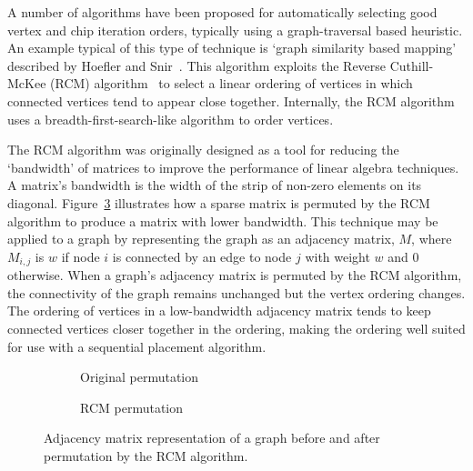 				A number of algorithms have been proposed for automatically selecting
				good vertex and chip iteration orders, typically using a
				graph-traversal based heuristic. An example typical of this type of
				technique is `graph similarity based mapping' described by Hoefler and
				Snir~\cite{hoefler11}. This algorithm exploits the Reverse
				Cuthill-McKee (RCM) algorithm~\cite{cuthill69} to select a linear
				ordering of vertices in which connected vertices tend to appear close
				together. Internally, the RCM algorithm uses a breadth-first-search-like
				algorithm to order vertices.
				
				The RCM algorithm was originally designed as a tool for reducing the
				`bandwidth' of matrices to improve the performance of linear algebra
				techniques. A matrix's bandwidth is the width of the strip of non-zero
				elements on its diagonal. Figure~\ref{fig:rcm} illustrates how a sparse
				matrix is permuted by the RCM algorithm to produce a matrix with lower
				bandwidth. This technique may be applied to a graph by representing the
				graph as an adjacency matrix, $M$, where $M_{i,j}$ is $w$ if node $i$
				is connected by an edge to node $j$ with weight $w$ and 0 otherwise.
				When a graph's adjacency matrix is permuted by the RCM algorithm, the
				connectivity of the graph remains unchanged but the vertex ordering
				changes. The ordering of vertices in a low-bandwidth adjacency matrix
				tends to keep connected vertices closer together in the ordering, making
				the ordering well suited for use with a sequential placement algorithm.
				
				\begin{figure}
					\center
					\begin{subfigure}{0.45\linewidth}
						\center
						
						\caption{Original permutation}
						\label{fig:rcm-initial}
					\end{subfigure}
					\begin{subfigure}{0.45\linewidth}
						\center
						
						\caption{RCM permutation}
						\label{fig:rcm-sorted}
					\end{subfigure}
					
					\caption[Graph adjacency matrix before and after RCM permutation.]%
					{Adjacency matrix representation of a graph before and after
					permutation by the RCM algorithm.}
					\label{fig:rcm}
				\end{figure}
				
